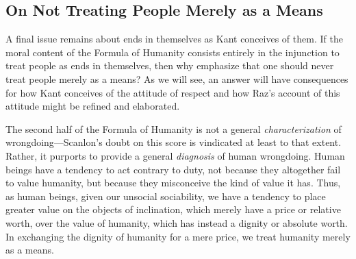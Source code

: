 \documentclass[12pt]{article}
\begin{document}

\subsection{On Not Treating People Merely as a Means} \label{sub:on_not_treating_people_merely_as_a_means} %

A final issue remains about ends in themselves as Kant conceives of them. If the moral content of the Formula of Humanity consists entirely in the injunction to treat people as ends in themselves, then why emphasize that one should never treat people merely as a means? As we will see, an answer will have consequences for how Kant conceives of the attitude of respect and how Raz's account of this attitude might be refined and elaborated.

The second half of the Formula of Humanity is not a general \emph{characterization} of wrongdoing---Scanlon's doubt on this score is vindicated at least to that extent. Rather, it purports to provide a general \emph{diagnosis} of human wrongdoing. Human beings have a tendency to act contrary to duty, not because they altogether fail to value humanity, but because they misconceive the kind of value it has. Thus, as human beings, given our unsocial sociability, we have a tendency to place greater value on the objects of inclination, which merely have a price or relative worth, over the value of humanity, which has instead a dignity or absolute worth. In exchanging the dignity of humanity for a mere price, we treat humanity merely as a means.
\end{document}
